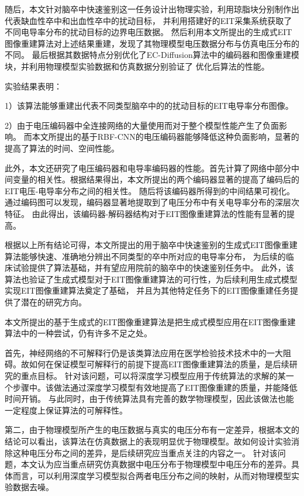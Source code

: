 随后，本文针对脑卒中快速鉴别这一任务设计出物理实验，利用琼脂块分别制作出代表缺血性卒中和出血性卒中的扰动目标，
并利用搭建好的EIT采集系统获取了不同电导率分布的扰动目标的边界电压数据。
然后利用本文所提出的生成式EIT图像重建算法对上述结果重建，发现了其物理模型电压数据分布与仿真电压分布的不同。
最后根据其数据特点分别优化了EC-Diffusion算法中的编码器和图像重建模块，并利用物理模型实验数据和仿真数据分别验证了
优化后算法的性能。

实验结果表明：

1）该算法能够重建出代表不同类型脑卒中的的扰动目标的EIT电导率分布图像。
 
2）由于电压编码器中全连接网络的大量使用而对于整个模型性能产生了负面影响。
而本文所提出的基于RBF-CNN的电压编码器能够降低这种负面影响，显著的提高了算法的时间、空间性能。

此外，本文还研究了电压编码器和电导率编码器的性能。首先计算了网络中部分中间变量的相关性。根据结果得出，本文所提出的两个编码器显著的提高了编码后的EIT电压-电导率分布之间的相关性。
随后将该编码器所得到的中间结果可视化。通过编码图可以发现，编码器显著地提取到了电压分布中有关电导率分布的深层次特征。
由此得出，该编码器-解码器结构对于EIT图像重建算法的性能有显著的提高。

根据以上所有结论可得，本文所提出的用于脑卒中快速鉴别的生成式EIT图像重建算法能够快速、准确地分辨出不同类型的卒中所对应的电导率分布，
为后续的临床试验提供了算法基础，并有望应用院前的脑卒中的快速鉴别任务中。
此外，该算法也验证了生成式模型对于EIT图像重建算法的可行性，为后续利用生成式模型实现EIT图像重建算法奠定了基础，
并且为其他特定任务下的EIT图像重建任务提供了潜在的研究方向。
 
 
本文所提出的基于生成式的EIT图像重建算法是把生成式模型应用在EIT图像重建算法中的一种尝试，仍有许多不足之处。
 
首先，神经网络的不可解释行仍是该类算法应用在医学检验技术技术中的一大阻碍。故如何在保证模型可解释行的前提下提高EIT图像重建算法的质量，是后续研究的重点目标。
针对该问题，可以将深度学习模型应用于传统算法的求解的某一个步骤中。该做法通过深度学习模型有效地提高了EIT图像重建的质量，并能降低时间开销。
与此同时，由于传统算法具有完善的数学物理模型，因此该做法也能一定程度上保证算法的可解释性。
 
第二，由于物理模型所产生的电压数据与真实的电压分布有一定差异，根据本文的结论可以看出，该算法在仿真数据上的表现明显优于物理模型。故如何设计实验消除这种电压分布之间的差异，是后续研究应当重点关注的内容之一。
针对该问题，本文认为应当重点研究仿真数据中电压分布于物理模型中电压分布的差异。具体而言，可以利用深度学习模型拟合两者电压分布之间的映射，从而对物理模型实验数据去噪。